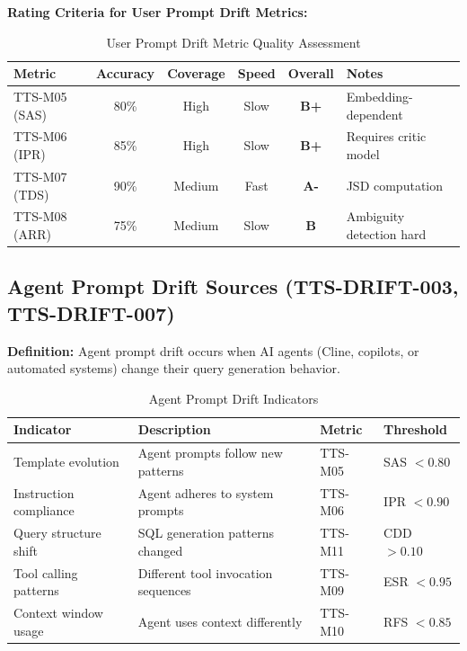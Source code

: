 \textbf{Rating Criteria for User Prompt Drift Metrics:}

\begin{table}[htbp]
\centering
\footnotesize
\caption{User Prompt Drift Metric Quality Assessment}
\label{tab:user-metric-rating}
\begin{tabularx}{\textwidth}{@{}l c c c c X@{}}
\toprule
\textbf{Metric} & \textbf{Accuracy} & \textbf{Coverage} & \textbf{Speed} & \textbf{Overall} & \textbf{Notes} \\
\midrule
TTS-M05 (SAS) & 80\% & High & Slow & \textbf{B+} & Embedding-dependent \\
TTS-M06 (IPR) & 85\% & High & Slow & \textbf{B+} & Requires critic model \\
TTS-M07 (TDS) & 90\% & Medium & Fast & \textbf{A-} & JSD computation \\
TTS-M08 (ARR) & 75\% & Medium & Slow & \textbf{B} & Ambiguity detection hard \\
\bottomrule
\end{tabularx}
\end{table}

\subsection{Agent Prompt Drift Sources (TTS-DRIFT-003, TTS-DRIFT-007)}

\textbf{Definition:} Agent prompt drift occurs when AI agents (Cline, copilots,
or automated systems) change their query generation behavior.

\begin{table}[htbp]
\centering
\footnotesize
\caption{Agent Prompt Drift Indicators}
\label{tab:agent-drift-indicators}
\begin{tabularx}{\textwidth}{@{}l X l l@{}}
\toprule
\textbf{Indicator} & \textbf{Description} & \textbf{Metric} & \textbf{Threshold} \\
\midrule
Template evolution & Agent prompts follow new patterns & TTS-M05 & SAS $< 0.80$ \\
Instruction compliance & Agent adheres to system prompts & TTS-M06 & IPR $< 0.90$ \\
Query structure shift & SQL generation patterns changed & TTS-M11 & CDD $> 0.10$ \\
Tool calling patterns & Different tool invocation sequences & TTS-M09 & ESR $< 0.95$ \\
Context window usage & Agent uses context differently & TTS-M10 & RFS $< 0.85$ \\
\bottomrule
\end{tabularx}
\end{table}

